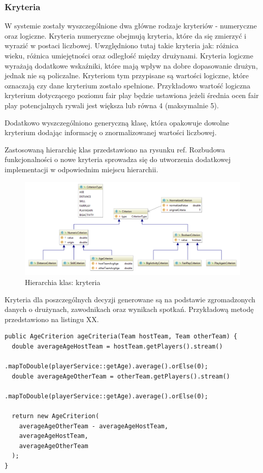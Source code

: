 \subsubsection{Kryteria}

W systemie zostały wyszczególnione dwa główne rodzaje kryteriów - numeryczne oraz logiczne. Kryteria numeryczne obejmują kryteria, które da się zmierzyć i wyrazić w postaci liczbowej. Uwzględniono tutaj takie kryteria jak: różnica wieku, różnica umiejętności oraz odległość między drużynami. Kryteria logiczne wyrażają dodatkowe wskaźniki, które mają wpływ na dobre dopasowanie drużyn, jednak nie są policzalne.  Kryteriom tym przypisane są wartości logiczne, które oznaczają czy dane kryterium zostało spełnione. Przykładowo wartość logiczna kryterium dotyczącego poziomu fair play będzie ustawiona jeżeli średnia ocen fair play potencjalnych rywali jest większa lub równa 4 (maksymalnie 5).

Dodatkowo wyszczególniono generyczną klasę, która opakowuje dowolne kryterium dodając informację o znormalizowanej wartości liczbowej. 

Zastosowaną hierarchię klas przedstawiono na rysunku ref. Rozbudowa funkcjonalności o nowe kryteria sprowadza się do utworzenia dodatkowej implementacji w odpowiednim miejscu hierarchii.  

\begin{figure}[H]
\centering
\includegraphics[width=\linewidth]{06-implementacja/rys/criterion-package-classes.PNG}
\caption{Hierarchia klas: kryteria}
\label{fig:criterion-classes}
\end{figure}

Kryteria dla poszczególnych decyzji generowane są na podstawie zgromadzonych danych o drużynach, zawodnikach oraz wynikach spotkań. Przykładową metodę przedstawiono na listingu XX. 


\begin{minipage}{\linewidth}
\begin{lstlisting}[label=list:age-crit-gen, caption=Przykładowa rejestracja kontrolera, basicstyle=\footnotesize\ttfamily]
public AgeCriterion ageCriteria(Team hostTeam, Team otherTeam) {
  double averageAgeHostTeam = hostTeam.getPlayers().stream()
                .mapToDouble(playerService::getAge).average().orElse(0);
  double averageAgeOtherTeam = otherTeam.getPlayers().stream()
                .mapToDouble(playerService::getAge).average().orElse(0);

  return new AgeCriterion(
    averageAgeOtherTeam - averageAgeHostTeam, 
    averageAgeHostTeam, 
    averageAgeOtherTeam
  );
}
\end{lstlisting}
\end{minipage}

